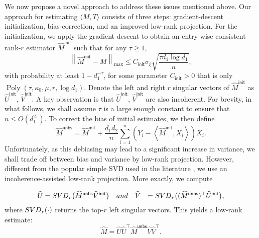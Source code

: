 \documentclass[12pt]{article}
\newcommand{\SVD}{{\rm SVD}}
\newcommand{\norm}[1]{\left\lVert#1\right\rVert}
\newcommand{\init}{{\mathsf{init}}}
\theoremstyle{plain}
\begin{document}
\begin{sloppypar}
{%
We now propose a novel approach to address these issues mentioned above. Our approach for estimating $\langle M, T\rangle$ consists of three steps: gradient-descent initialization, bias-correction, and an improved low-rank projection. For the initialization, we apply the gradient descent \citep{chen2019inference} to obtain an entry-wise consistent rank-$r$ estimator $\widehat{M}^{\mathsf{init}}$ such that for any $\tau\ge 1$,
\begin{equation}\label{eq:init-est}
	\norm{\widehat{M}^{\mathsf{init}} - M}_{\max} \le C_{\init}  \sigma_\xi \sqrt{\frac{\tau  d_1 \log d_1}{n }} ,
\end{equation}
with probability at least $1-d_1^{-\tau}$, for some parameter $C_{\init}>0$ that is only $\operatorname{Poly}(\tau,\kappa_0,\mu,r,\log d_1)$. Denote the  left and right $r$ singular vectors of $\widehat{M}^{\mathsf{init}} $ as $\widehat{U}^{\mathsf{init}}$, $\widehat{V}^{\mathsf{init}} $. A key observation is that $\widehat{U}^{\mathsf{init}}$, $\widehat{V}^{\mathsf{init}} $ are also incoherent.  For brevity, in what follows, we shall assume $\tau$ is a large enough constant to ensure that $n\le O(d_1^{2\tau})$. To correct the bias of initial estimates, we then define
\begin{equation}\label{eq:debias}
    \widehat{M}^{\mathsf {unbs }}=\widehat{M}^{\mathsf{init}}+\frac{d_1 d_2}{n} \sum_{i=1}^n\left(Y_i-\left\langle\widehat{M}^{\mathsf{init}}, X_i\right\rangle\right) X_i. 
\end{equation}
Unfortunately, as this debiasing may lead to a significant increase in variance, we shall trade off between bias and variance by low-rank projection. However, different from the popular simple SVD used in the literature \citep{chen2019inference,xia2021statistical}, we use an incoherence-assisted low-rank projection. More exactly, we compute

\begin{equation}\label{eq:left-SVD}
    \begin{aligned}
        \widehat{U} &= \SVD_{r}\big(\widehat{M}^{\mathsf {unbs }}\widehat{V}^{\mathsf{init}} \big)\quad {\rm and} \quad \widehat{V} &= \SVD_{r}\big((\widehat{M}^{\mathsf {unbs }})^\top \widehat{U}^{\mathsf{init}} \big),
    \end{aligned}
\end{equation}
where $ \SVD_{r}(\cdot)$ returns the top-$r$ left singular vectors. This yields a low-rank estimate:
\begin{equation}\label{eq:lr-retraction}
    \widehat{M}= \widehat{U}  \widehat{U} ^\top\widehat{M}^{\mathsf {unbs }} \widehat{V} \widehat{V}^\top.
\end{equation}

}
\end{sloppypar}
\end{document}

